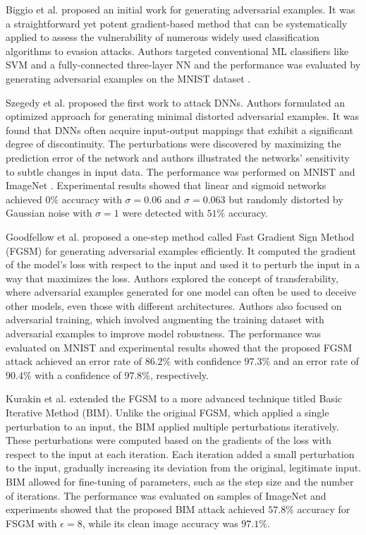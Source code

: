 \documentclass[sn-mathphys]{sn-jnl}%
\theoremstyle{thmstyleone}%
\theoremstyle{thmstyletwo}%
\theoremstyle{thmstylethree}%
\begin{document}
Biggio et al. \cite{biggio2013evasion} proposed an initial work for generating adversarial examples. It was a straightforward yet potent gradient-based method that can be systematically applied to assess the vulnerability of numerous widely used classification algorithms to evasion attacks. Authors targeted conventional ML classifiers like SVM and a fully-connected three-layer NN and the performance was evaluated by generating adversarial examples on the MNIST dataset \cite{mnist}.

Szegedy et al. \cite{szegedy2013intriguing} proposed the first work to attack DNNs. Authors formulated an optimized approach for generating minimal distorted adversarial examples. It was found that DNNs often acquire input-output mappings that exhibit a significant degree of discontinuity. The perturbations were discovered by maximizing the prediction error of the network and authors illustrated the networks' sensitivity to subtle changes in input data. The performance was performed on MNIST \cite{mnist} and ImageNet \cite{ImageNet}. Experimental results showed that linear and sigmoid networks achieved $0\%$ accuracy with $\sigma = 0.06$ and $\sigma = 0.063$ but randomly distorted by Gaussian noise with $\sigma = 1$ were detected with $51\%$ accuracy.

Goodfellow et al. \cite{goodfellow2014explaining} proposed a one-step method called Fast Gradient Sign Method (FGSM) for generating adversarial examples efficiently. It computed the gradient of the model's loss with respect to the input and used it to perturb the input in a way that maximizes the loss. Authors explored the concept of transferability, where adversarial examples generated for one model can often be used to deceive other models, even those with different architectures. Authors also focused on adversarial training, which involved augmenting the training dataset with adversarial examples to improve model robustness. The performance was evaluated on MNIST \cite{mnist} and experimental results showed that the proposed FGSM attack achieved an error rate of $86.2\%$ with confidence $97.3\%$ and an error rate of $90.4\%$ with a confidence of $97.8\%$, respectively.  

Kurakin et al. \cite{kurakin2016adversarial} extended the FGSM to a more advanced technique titled Basic Iterative Method (BIM). Unlike the original FGSM, which applied a single perturbation to an input, the BIM applied multiple perturbations iteratively. These perturbations were computed based on the gradients of the loss with respect to the input at each iteration. Each iteration added a small perturbation to the input, gradually increasing its deviation from the original, legitimate input. BIM allowed for fine-tuning of parameters, such as the step size and the number of iterations. The performance was evaluated on samples of ImageNet \cite{ImageNet} and experiments showed that the proposed BIM attack achieved $57.8\%$ accuracy for FSGM with $\epsilon = 8$, while its clean image accuracy was $97.1\%$.
\end{document}
